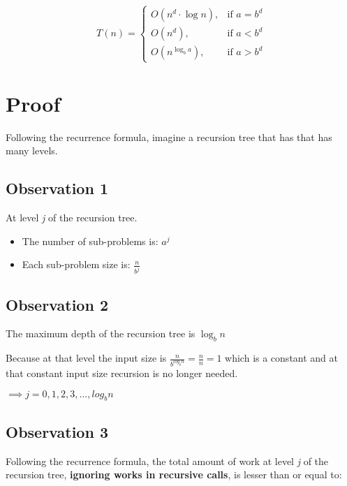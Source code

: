 \documentclass{article}
\begin{document}
\bigskip

\begin{equation*}
T(n) = 
\begin{cases}
    O(n^d \cdot \log n),& \text{if } a = b^d\\
    O(n^d),& \text{if } a < b^d\\
    O(n^{\log_{b} a}),& \text{if } a > b^d
\end{cases}
\end{equation*}

\section{Proof}

Following the recurrence formula, imagine a recursion tree that has that has many levels.

\subsection*{Observation 1}

At level \textit{j} of the recursion tree.

\begin{itemize}[label={}]
    \item The number of sub-problems is: $a^j$
    \item Each sub-problem size is: $\frac{n}{b^j}$
\end{itemize}

\subsection*{Observation 2}

The maximum depth of the recursion tree is $\log_{b} n$

\bigskip

\noindent Because at that level the input size is $\frac{n}{b^{log_{b} n}} = \frac{n}{n} = 1$ which is a constant and at that constant input size recursion is no longer needed.  

\bigskip

\noindent$\implies j = 0, 1, 2, 3, ..., log_{b} n$

\subsection*{Observation 3}

Following the recurrence formula, the total amount of work at level \textit{j} of the recursion tree, \textbf{ignoring works in recursive calls}, is lesser than or equal to:  
\end{document}
